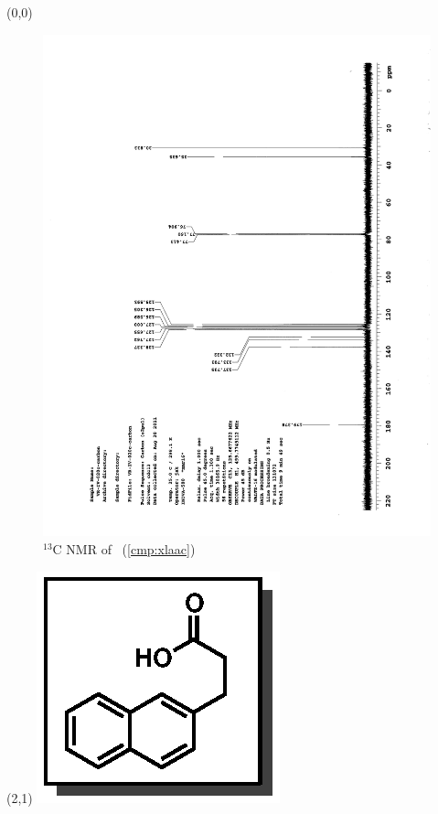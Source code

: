 \clearpage
\begin{textblock}{20}(0,0)
\begin{figure}[htb]
\caption{$^{13}$C NMR of  \CMPxlaac\ (\ref{cmp:xlaac})}
\includegraphics[scale=0.75, trim = 0mm 0mm 0mm 5mm,
clip]{chp_asymmetric/images/nmr/xlaacC}
\vspace{-100pt}
\end{figure}
\end{textblock}
\begin{textblock}{1}(2,1)
\includegraphics[scale=0.8, angle=90]{chp_asymmetric/images/xlaac}
\end{textblock}
\clearpage


